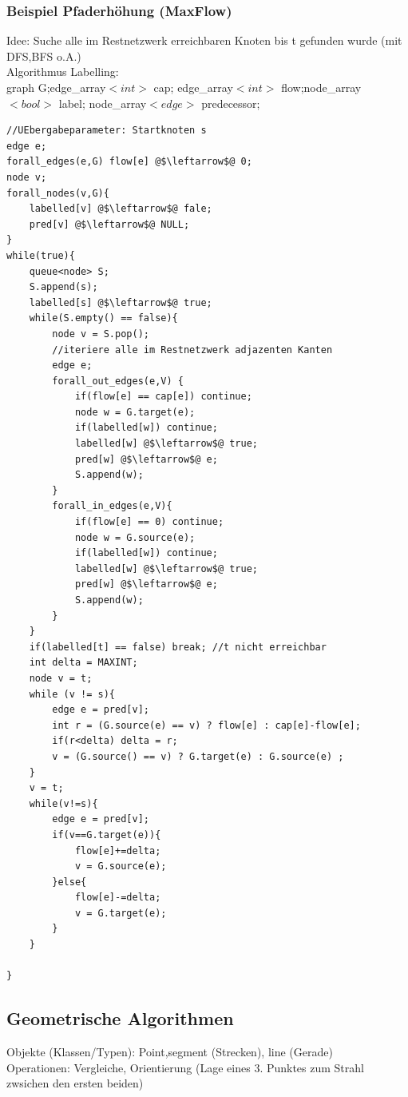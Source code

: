 \documentclass[a4paper]{article}
\begin{document}
\subsubsection*{Beispiel Pfaderhöhung (MaxFlow)}
Idee: Suche alle im Restnetzwerk erreichbaren Knoten bis t gefunden wurde (mit DFS,BFS o.A.)\\
Algorithmus Labelling:\\
\hspace*{1cm} graph G;edge\_array$<int>$ cap; edge\_array$<int>$ flow;node\_array$<bool>$ label; node\_array$<edge>$ predecessor;\\
\begin{lstlisting}[escapechar=@]
//UEbergabeparameter: Startknoten s
edge e;
forall_edges(e,G) flow[e] @$\leftarrow$@ 0;
node v;
forall_nodes(v,G){
	labelled[v] @$\leftarrow$@ fale;
	pred[v] @$\leftarrow$@ NULL;
}
while(true){
	queue<node> S;
	S.append(s);
	labelled[s] @$\leftarrow$@ true;
	while(S.empty() == false){
		node v = S.pop();
		//iteriere alle im Restnetzwerk adjazenten Kanten
		edge e;
		forall_out_edges(e,V) {
			if(flow[e] == cap[e]) continue;
			node w = G.target(e);
			if(labelled[w]) continue;
			labelled[w] @$\leftarrow$@ true;
			pred[w] @$\leftarrow$@ e;
			S.append(w);
		}
		forall_in_edges(e,V){
			if(flow[e] == 0) continue;
			node w = G.source(e);
			if(labelled[w]) continue;
			labelled[w] @$\leftarrow$@ true;
			pred[w] @$\leftarrow$@ e;
			S.append(w);
		}
	}
	if(labelled[t] == false) break; //t nicht erreichbar
	int delta = MAXINT;
	node v = t;
	while (v != s){
		edge e = pred[v];
		int r = (G.source(e) == v) ? flow[e] : cap[e]-flow[e];
		if(r<delta) delta = r;
		v = (G.source() == v) ? G.target(e) : G.source(e) ;
	}
	v = t;
	while(v!=s){
		edge e = pred[v];
		if(v==G.target(e)){
			flow[e]+=delta;
			v = G.source(e);
		}else{
			flow[e]-=delta;
			v = G.target(e);
		}
	}
		
}
\end{lstlisting}
\subsection*{Geometrische Algorithmen}
Objekte (Klassen/Typen): Point,segment (Strecken), line (Gerade)\\
Operationen: Vergleiche, Orientierung (Lage eines 3. Punktes zum Strahl zwsichen den ersten beiden)
\end{document}

